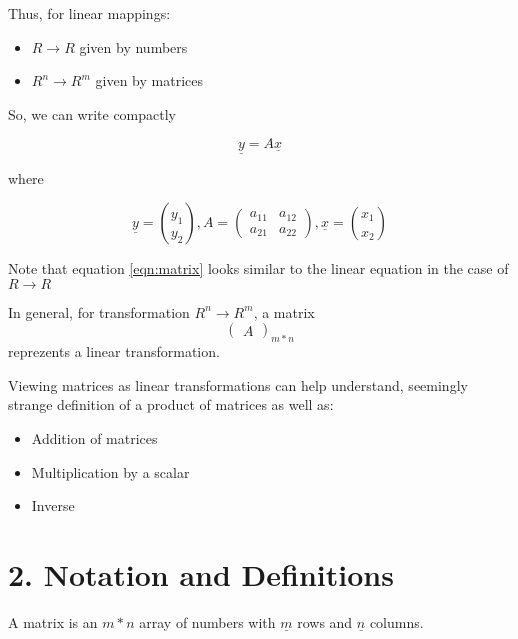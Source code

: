 \documentclass[]{article}
\begin{document}
Thus, for linear mappings:

\begin{itemize}
\item
  \(R \to R\) \textbar{} given by numbers
\item
  \(R^{n} \to R^{m}\) \textbar{} given by matrices
\end{itemize}

So, we can write compactly

\begin{equation}\label{eqn:matrix}\underline{y}=A\underline{x}\end{equation}

where

\[\underline{y}=\binom{y_1}{y_2},  A = \begin{pmatrix} a_{11} & a_{12} \\ a_{21} & a_{22} \end{pmatrix} , \underline{x}=\binom{x_1}{x_2}\]

Note that equation \eqref{eqn:matrix} looks similar to the linear
equation in the case of \(R \to R\)

In general, for transformation \(R^{n} \to R^{m}\), a matrix
\[\begin{pmatrix}A\end{pmatrix}_{m*n}\] reprezents a linear
transformation.

Viewing matrices as linear transformations can help understand,
seemingly strange definition of a product of matrices as well as:

\begin{itemize}
\item
  Addition of matrices
\item
  Multiplication by a scalar
\item
  Inverse
\end{itemize}

\section{\texorpdfstring{2. Notation and Definitions\\
}{2. Notation and Definitions }}\label{notation-and-definitions}

\begin{tcolorbox}[colback=green!5,colframe=red!40!black,title=Definition]
A matrix is an $m*n$ array of numbers with  $\underline{m}$ rows and  $\underline{n}$ columns.
\end{tcolorbox}
\end{document}
